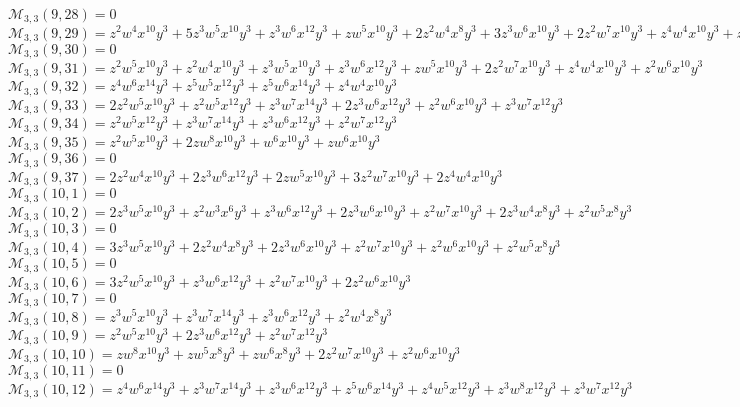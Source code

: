 $\mathcal{M}_{3,3}(9,28)=0$\\
$\mathcal{M}_{3,3}(9,29)=z^2w^4x^{10}y^3+5z^3w^5x^{10}y^3+z^3w^6x^{12}y^3+zw^5x^{10}y^3+2z^2w^4x^8y^3+3z^3w^6x^{10}y^3+2z^2w^7x^{10}y^3+z^4w^4x^{10}y^3+z^2w^5x^8y^3$\\
$\mathcal{M}_{3,3}(9,30)=0$\\
$\mathcal{M}_{3,3}(9,31)=z^2w^5x^{10}y^3+z^2w^4x^{10}y^3+z^3w^5x^{10}y^3+z^3w^6x^{12}y^3+zw^5x^{10}y^3+2z^2w^7x^{10}y^3+z^4w^4x^{10}y^3+z^2w^6x^{10}y^3$\\
$\mathcal{M}_{3,3}(9,32)=z^4w^6x^{14}y^3+z^5w^5x^{12}y^3+z^5w^6x^{14}y^3+z^4w^4x^{10}y^3$\\
$\mathcal{M}_{3,3}(9,33)=2z^2w^5x^{10}y^3+z^2w^5x^{12}y^3+z^3w^7x^{14}y^3+2z^3w^6x^{12}y^3+z^2w^6x^{10}y^3+z^3w^7x^{12}y^3$\\
$\mathcal{M}_{3,3}(9,34)=z^2w^5x^{12}y^3+z^3w^7x^{14}y^3+z^3w^6x^{12}y^3+z^2w^7x^{12}y^3$\\
$\mathcal{M}_{3,3}(9,35)=z^2w^5x^{10}y^3+2zw^8x^{10}y^3+w^6x^{10}y^3+zw^6x^{10}y^3$\\
$\mathcal{M}_{3,3}(9,36)=0$\\
$\mathcal{M}_{3,3}(9,37)=2z^2w^4x^{10}y^3+2z^3w^6x^{12}y^3+2zw^5x^{10}y^3+3z^2w^7x^{10}y^3+2z^4w^4x^{10}y^3$\\
$\mathcal{M}_{3,3}(10,1)=0$\\
$\mathcal{M}_{3,3}(10,2)=2z^3w^5x^{10}y^3+z^2w^3x^6y^3+z^3w^6x^{12}y^3+2z^3w^6x^{10}y^3+z^2w^7x^{10}y^3+2z^3w^4x^8y^3+z^2w^5x^8y^3$\\
$\mathcal{M}_{3,3}(10,3)=0$\\
$\mathcal{M}_{3,3}(10,4)=3z^3w^5x^{10}y^3+2z^2w^4x^8y^3+2z^3w^6x^{10}y^3+z^2w^7x^{10}y^3+z^2w^6x^{10}y^3+z^2w^5x^8y^3$\\
$\mathcal{M}_{3,3}(10,5)=0$\\
$\mathcal{M}_{3,3}(10,6)=3z^2w^5x^{10}y^3+z^3w^6x^{12}y^3+z^2w^7x^{10}y^3+2z^2w^6x^{10}y^3$\\
$\mathcal{M}_{3,3}(10,7)=0$\\
$\mathcal{M}_{3,3}(10,8)=z^3w^5x^{10}y^3+z^3w^7x^{14}y^3+z^3w^6x^{12}y^3+z^2w^4x^8y^3$\\
$\mathcal{M}_{3,3}(10,9)=z^2w^5x^{10}y^3+2z^3w^6x^{12}y^3+z^2w^7x^{12}y^3$\\
$\mathcal{M}_{3,3}(10,10)=zw^8x^{10}y^3+zw^5x^8y^3+zw^6x^8y^3+2z^2w^7x^{10}y^3+z^2w^6x^{10}y^3$\\
$\mathcal{M}_{3,3}(10,11)=0$\\
$\mathcal{M}_{3,3}(10,12)=z^4w^6x^{14}y^3+z^3w^7x^{14}y^3+z^3w^6x^{12}y^3+z^5w^6x^{14}y^3+z^4w^5x^{12}y^3+z^3w^8x^{12}y^3+z^3w^7x^{12}y^3$\\
